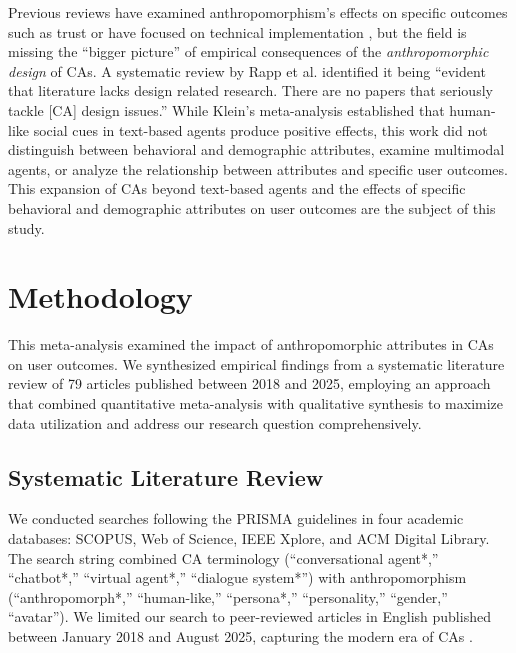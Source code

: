 \documentclass[sigconf,review,anonymous]{acmart}
\begin{document}
Previous reviews have examined anthropomorphism's effects on specific outcomes such as trust \citep{bach2024systematic} or have focused on technical implementation \cite{chen2024trends}, but the field is missing the ``bigger picture'' of empirical consequences of the \textit{anthropomorphic design} of CAs. A systematic review by Rapp et al. \cite{rapp_human_2021} identified it being ``evident that literature lacks design related research. There are no papers that seriously tackle [CA] design issues.'' While Klein's \cite{klein_effects_2025} meta-analysis established that human-like social cues in text-based agents produce positive effects, this work did not distinguish between behavioral and demographic attributes, examine multimodal agents, or analyze the relationship between attributes and specific user outcomes. This expansion of CAs beyond text-based agents and the effects of specific behavioral and demographic attributes on user outcomes are the subject of this study. 

\section{Methodology}

This meta-analysis examined the impact of anthropomorphic attributes in CAs on user outcomes. We synthesized empirical findings from a systematic literature review \cite{amin2025anthropomorphism} of 79 articles published between 2018 and 2025, employing an approach that combined quantitative meta-analysis with qualitative synthesis to maximize data utilization and address our research question comprehensively.

\subsection{Systematic Literature Review}

We conducted searches following the PRISMA guidelines \cite{page_prisma_2021} in four academic databases: SCOPUS, Web of Science, IEEE Xplore, and ACM Digital Library. The search string combined CA terminology (``conversational agent*,'' ``chatbot*,'' ``virtual agent*,'' ``dialogue system*'') with anthropomorphism (``anthropomorph*,'' ``human-like,'' ``persona*,'' ``personality,'' ``gender,'' ``avatar''). We limited our search to peer-reviewed articles in English published between January 2018 and August 2025, capturing the modern era of CAs \cite{zhang2018personalizing}. %
\end{document}
